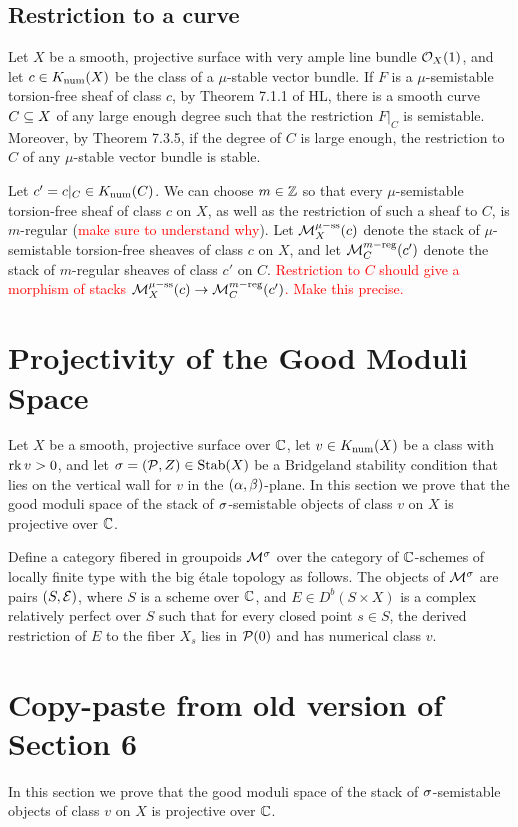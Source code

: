 \documentclass[letterpaper,10pt]{article}
\begin{document}
\subsection{Restriction to a curve}
Let $X$ be a smooth, projective surface with very ample line bundle $\mathcal{O}_X(1)$, and let $c \in K_{\mathrm{num}}(X)$ be the class of a $\mu$-stable vector bundle. If $F$ is a $\mu$-semistable torsion-free sheaf of class $c$, by Theorem 7.1.1 of HL, there is a smooth curve $C \subseteq X$ of any large enough degree such that the restriction $F|_C$ is semistable. Moreover, by Theorem 7.3.5, if the degree of $C$ is large enough, the restriction to $C$ of any $\mu$-stable vector bundle is stable.

Let $c' = c|_C \in K_{\mathrm{num}}(C)$. We can choose $m \in \mathbb{Z}$ so that every $\mu$-semistable torsion-free sheaf of class $c$ on $X$, as well as the restriction of such a sheaf to $C$, is $m$-regular (\textcolor{red}{make sure to understand why}). Let $\mathcal{M}^{\mu-\mathrm{ss}}_X(c)$ denote the stack of $\mu$-semistable torsion-free sheaves of class $c$ on $X$, and let $\mathcal{M}^{m-\mathrm{reg}}_C(c')$ denote the stack of $m$-regular sheaves of class $c'$ on $C$. \textcolor{red}{Restriction to $C$ should give a morphism of stacks $\mathcal{M}^{\mu-\mathrm{ss}}_X(c) \to \mathcal{M}^{m-\mathrm{reg}}_C(c')$. Make this precise.}


\section{Projectivity of the Good Moduli Space}
Let $X$ be a smooth, projective surface over $\mathbb{C}$, let $v \in K_{\mathrm{num}}(X)$ be a class with $\operatorname{\mathrm{rk}} v > 0$, and let $\sigma = (\mathcal{P}, Z) \in \operatorname{\mathrm{Stab}}(X)$ be a Bridgeland stability condition that lies on the vertical wall for $v$ in the $(\alpha, \beta)$-plane. In this section we prove that the good moduli space of the stack of $\sigma$-semistable objects of class $v$ on $X$ is projective over $\mathbb{C}$.

Define a category fibered in groupoids $\mathcal{M}^\sigma$ over the category of $\mathbb{C}$-schemes of locally finite type with the big \'etale topology as follows. The objects of $\mathcal{M}^\sigma$ are pairs $(S, \mathcal{E})$, where $S$ is a scheme over $\mathbb{C}$, and $E \in D^b(S \times X)$ is a complex relatively perfect over $S$ such that for every closed point $s \in S$, the derived restriction of $E$ to the fiber $X_s$ lies in $\mathcal{P}(0)$ and has numerical class $v$. 

\section{Copy-paste from old version of Section 6}
 In this section we prove that the good moduli space of the stack of $\sigma$-semistable objects of class $v$ on $X$ is projective over $\mathbb{C}$.
\end{document}
